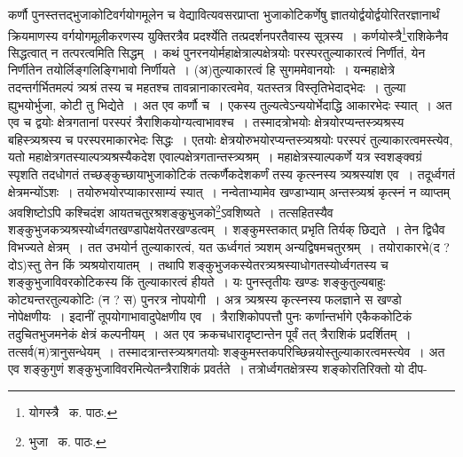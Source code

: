 \documentclass[11pt, openany]{book}
\begin{document}
\noindent कर्णौ पुनस्तत्तद्भुजाकोटिवर्गयोगमूलेन च वेद्यावित्यवसरप्राप्ता भुजाकोटिकर्णेषु ज्ञातयोर्द्वयोर्द्वयोरितरज्ञानार्थं क्रियमाणस्य
वर्गयोगमूलीकरणस्य युक्तिरत्रैव प्रदर्श्येति तत्प्रदर्शनपरतैवास्य सूत्रस्य~। कर्णयोस्त्रै\renewcommand{\thefootnote}{१}\footnote{योगस्त्रै \textendash\ क. पाठः.}राशिकेनैव सिद्धत्वात् न तत्परत्वमिति सिद्धम्~। कथं पुनरनयोर्महाक्षेत्राल्पक्षेत्रयोः परस्परतुल्याकारत्वं निर्णीतं, येन निर्णीतेन तयोर्लिङ्गलिङ्गिभावो निर्णीयते~। (अ)तुल्याकारत्वं हि सुगममेवानयोः~। यन्महाक्षेत्रे तदन्तर्गर्भितमल्पं त्र्यश्रं तस्य च महतश्च तावन्नानाकारत्वमेव, यतस्तत्र विस्तृतिभेदाद्भेदः~। तुल्या ह्युभयोर्भुजा, कोटी तु भिद्येते~। अत एव कर्णौ च~। एकस्य तुल्यत्वेऽन्ययोर्भेदाद्धि आकारभेदः स्यात्~। अत एव च द्वयोः क्षेत्रगतानां परस्परं त्रैराशिकयोग्यत्वाभावश्च~। तस्मादत्रोभयोः क्षेत्रयोरप्यन्तस्त्र्यश्रस्य बहिस्त्र्यश्रस्य च परस्परमाकारभेदः सिद्धः~। एतयोः क्षेत्रयोरुभयोरप्यन्तस्त्र्यश्रयोः परस्परं तुल्याकारत्वमस्त्येव, यतो महाक्षेत्रगतस्याल्पत्र्यश्रस्यैकदेश एवाल्पक्षेत्रगतान्तस्त्र्यश्रम्~। महाक्षेत्रस्याल्पकर्णे यत्र स्वशङ्क्वग्रं स्पृशति तदधोगतं तच्छङ्कुच्छायाभुजाकोटिकं तत्कर्णैकदेशकर्णं तस्य कृत्स्नस्य त्र्यश्रस्यांश एव~। तदूर्ध्वगतं क्षेत्रमन्योंऽशः~। तयोरुभयोरप्याकारसाम्यं स्यात्~। नन्वेताभ्यामेव खण्डाभ्याम् अन्तस्त्र्यश्रं कृत्स्नं न व्याप्तम् अवशिष्टोऽपि कश्चिदंश आयतचतुरश्रशङ्कुभुजको\renewcommand{\thefootnote}{२}\footnote{भुजा \textendash\ क. पाठः.}ऽवशिष्यते~। तत्सहितस्यैव शङ्कुभुजकत्र्यश्रस्योर्ध्वगतखण्डापेक्षयेतरखण्डत्वम्~। शङ्कुमस्तकात् प्रभृति तिर्यक् छिद्यते~। तेन द्विधैव विभज्यते क्षेत्रम्~। तत उभयोर्न तुल्याकारत्वं, यत ऊर्ध्वगतं त्र्यशम् अन्यद्विषमचतुरश्रम्~। तयोराकारभे(द ? दोऽ)स्तु तेन किं त्र्यश्रयोरायातम्~। तथापि
शङ्कुभुजकस्येतरत्र्यश्रस्याधोगतस्योर्ध्वगतस्य च शङ्कुभुजाविवरकोटिकस्य किं तुल्याकारत्वं हीयते~। यः पुनस्तृतीयः खण्डः शङ्कुतुल्यबाहुः कोट्यन्तरतुल्यकोटिः (न ? स) पुनरत्र नोपयोगी~। अत्र त्र्यश्रस्य कृत्स्नस्य फलज्ञाने स खण्डो नोपेक्षणीयः~। इदानीं
तूपयोगाभावादुपेक्षणीय एव~। त्रैराशिकोपपत्तौ पुनः कर्णान्तर्भागे एकैककोटिकं तदुचितभुजमनेकं क्षेत्रं कल्पनीयम्~। अत एव क्रकचधारादृष्टान्तेन पूर्वं
तत् त्रैराशिकं प्रदर्शितम्~। तत्सर्व(म)त्रानुसन्धेयम्~। तस्मादत्रान्तस्त्र्यश्रगतयोः शङ्कुमस्तकपरिच्छिन्नयोस्तुल्याकारत्वमस्त्येव~। अत एव शङ्कुगुणं
शङ्कुभुजाविवरमित्येतन्त्रैराशिकं प्रवर्तते~। तत्रोर्ध्वगतक्षेत्रस्य शङ्कोरतिरिक्तो यो दीप-

\newpage
\end{document}
